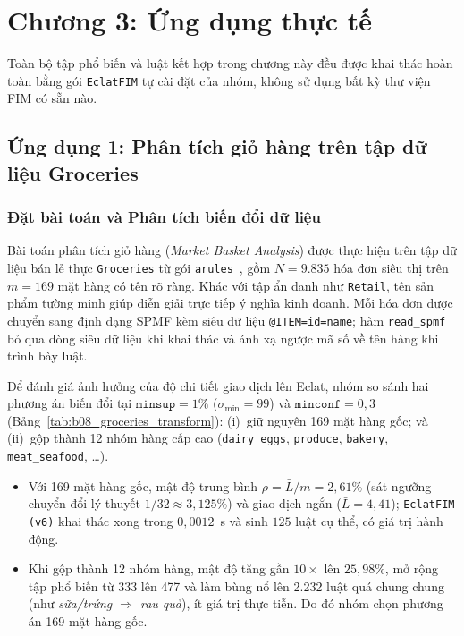 \section{Chương 3: Ứng dụng thực tế}
\label{sec:05_chapter3_applications}

Toàn bộ tập phổ biến và luật kết hợp trong chương này đều được khai thác hoàn toàn bằng gói \texttt{EclatFIM} tự cài đặt của nhóm, không sử dụng bất kỳ thư viện FIM có sẵn nào.

\subsection{Ứng dụng 1: Phân tích giỏ hàng trên tập dữ liệu Groceries}
\label{subsec:app1_groceries}

\subsubsection{Đặt bài toán và Phân tích biến đổi dữ liệu}
Bài toán phân tích giỏ hàng (\emph{Market Basket Analysis}) được thực hiện trên tập dữ liệu bán lẻ thực \texttt{Groceries} từ gói \texttt{arules}~\cite{hahsler2005arules}, gồm $N = 9.835$ hóa đơn siêu thị trên $m = 169$ mặt hàng có tên rõ ràng. Khác với tập ẩn danh như \texttt{Retail}, tên sản phẩm tường minh giúp diễn giải trực tiếp ý nghĩa kinh doanh. Mỗi hóa đơn được chuyển sang định dạng SPMF kèm siêu dữ liệu \texttt{@ITEM=id=name}; hàm \texttt{read\_spmf} bỏ qua dòng siêu dữ liệu khi khai thác và ánh xạ ngược mã số về tên hàng khi trình bày luật.

Để đánh giá ảnh hưởng của độ chi tiết giao dịch lên Eclat, nhóm so sánh hai phương án biến đổi tại $\texttt{minsup} = 1\%$ ($\sigma_{\min} = 99$) và $\texttt{minconf} = 0{,}3$ (Bảng~\ref{tab:b08_groceries_transform}): (i)~giữ nguyên 169 mặt hàng gốc; và (ii)~gộp thành 12 nhóm hàng cấp cao (\texttt{dairy\_eggs}, \texttt{produce}, \texttt{bakery}, \texttt{meat\_seafood}, \dots).
\begin{itemize}
    \item Với 169 mặt hàng gốc, mật độ trung bình $\rho = \bar{L}/m = 2{,}61\%$ (sát ngưỡng chuyển đổi lý thuyết $1/32 \approx 3{,}125\%$) và giao dịch ngắn ($\bar{L} = 4{,}41$); \texttt{EclatFIM (v6)} khai thác xong trong $0{,}0012$~s và sinh $125$ luật cụ thể, có giá trị hành động.
    \item Khi gộp thành 12 nhóm hàng, mật độ tăng gần $10\times$ lên $25{,}98\%$, mở rộng tập phổ biến từ 333 lên 477 và làm bùng nổ lên 2.232 luật quá chung chung (như \emph{sữa/trứng $\Rightarrow$ rau quả}), ít giá trị thực tiễn. Do đó nhóm chọn phương án 169 mặt hàng gốc.
\end{itemize}


